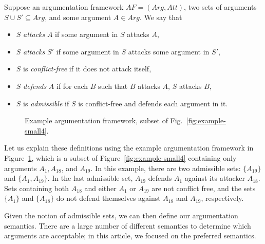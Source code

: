 \begin{definition} Suppose an argumentation framework $AF=(Arg,Att)$, two sets of arguments $S\cup S'\subseteq Arg$, and some argument $A\in Arg$. We say that
\begin{itemize}
\item $S$ \emph{attacks} $A$ if some argument in $S$ attacks $A$,
\item $S$ \emph{attacks} $S'$ if some argument in $S$ attacks some argument in $S'$,
\item $S$ is \emph{conflict-free} if it does not attack itself,
\item $S$ \emph{defends} $A$ if for each $B$ such that $B$ attacks $A$, $S$ attacks $B$,
\item $S$ is \emph{admissible} if $S$ is conflict-free and defends each argument in it.
\end{itemize}
\end{definition}

\begin{figure}[ht!]
\centering
{}
\caption{Example argumentation framework, subset of Fig.~\ref{fig:example-small4}.}
\label{fig:goalmodeling:arg2}
\end{figure}

Let us explain these definitions using the example argumentation framework in Figure~\ref{fig:goalmodeling:arg2}, which is a subset of Figure~\ref{fig:example-small4} containing only arguments $A_1, A_{18}$, and $A_{19}$. In this example, there are two admissible sets: $\{A_{19}\}$ and $\{A_1, A_{19}\}$. In the last admissible set, $A_{19}$ defends $A_1$ against its attacker $A_{18}$. Sets containing both $A_{18}$ and either $A_1$ or $A_{19}$ are not conflict free, and the sets $\{A_1\}$ and $\{A_{18}\}$ do not defend themselves against $A_{18}$ and $A_{19}$, respectively. 

Given the notion of admissible sets, we can then define our argumentation semantics. There are a large number of different semantics to determine which arguments are acceptable; in this article, we focused on the preferred semantics.

